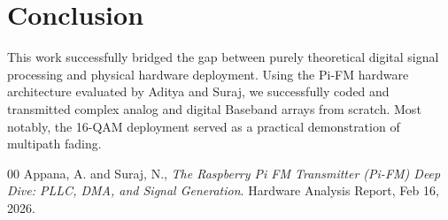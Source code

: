 \documentclass[conference]{IEEEtran}
\begin{document}
\section{Conclusion}
This work successfully bridged the gap between purely theoretical digital signal processing and physical hardware deployment. Using the Pi-FM hardware architecture evaluated by Aditya and Suraj, we successfully coded and transmitted complex analog and digital Baseband arrays from scratch. Most notably, the 16-QAM deployment served as a practical demonstration of multipath fading.

\begin{thebibliography}{00}
 Appana, A. and Suraj, N., \emph{The Raspberry Pi FM Transmitter (Pi-FM) Deep Dive: PLLC, DMA, and Signal Generation}. Hardware Analysis Report, Feb 16, 2026.
\end{thebibliography}
\end{document}
